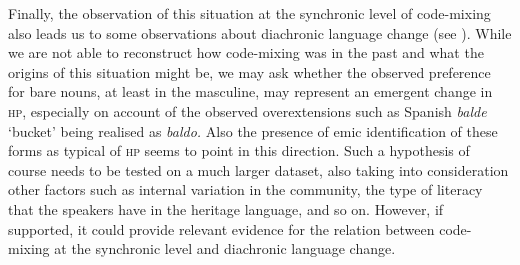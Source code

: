 \documentclass[output=paper]{langscibook}
\begin{document}
Finally, the observation of this situation at the synchronic level of code-mixing also leads us to some observations about diachronic language change (see \citealt{Backus2005}). While we are not able to reconstruct how code-mixing was in the past and what the origins of this situation might be, we may ask whether the observed preference for bare nouns, at least in the masculine, may represent an emergent change in \textsc{hp}, especially on account of the observed overextensions such as Spanish \textit{balde} ‘bucket’ being realised as \textit{baldo.} Also the presence of emic identification of these forms as typical of \textsc{hp} seems to point in this direction. Such a hypothesis of course needs to be tested on a much larger dataset, also taking into consideration other factors such as internal variation in the community, the type of literacy that the speakers have in the heritage language, and so on. However, if supported, it could provide relevant evidence for the relation between code-mixing at the synchronic level and diachronic language change.


\sloppy\printbibliography[heading=subbibliography,notkeyword=this]
\end{document}
